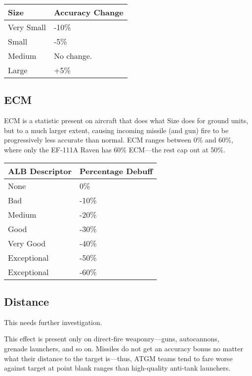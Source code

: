 \documentclass{article}
\begin{document}
\begin{center}
    \begin{tabular}{ | l | p{3cm} | }
    \hline
    Size & Accuracy Change \\ \hline
    Very Small & -10\% \\
    Small & -5\% \\ 
    Medium & No change. \\ 
    Large & +5\% \\ \hline
    \end{tabular}
\end{center}

\subsection{ECM}

ECM is a statistic present on aircraft that does what Size does for ground
units, but to a much larger extent, causing incoming missile (and gun) fire to
be progressively less accurate than normal. ECM ranges between 0\% and 60\%,
where only the EF-111A Raven has 60\% ECM---the rest cap out at 50\%.

\begin{center}
    \begin{tabular}{ | l | p{3cm} | }
    \hline
    ALB Descriptor & Percentage Debuff \\ \hline
    None & 0\% \\
    Bad & -10\% \\ 
    Medium & -20\% \\ 
    Good & -30\% \\ 
    Very Good & -40\% \\
    Exceptional & -50\% \\
    Exceptional & -60\% \\
    \hline
    \end{tabular}
\end{center}

\subsection{Distance}

This needs further investigation.

This effect is present only on direct-fire weaponry---guns, autocannons,\\
grenade launchers, and so on. Missiles do not get an accuracy bonus no matter
what their distance to the target is---thus, ATGM teams tend to fare worse
against target at point blank ranges than high-quality anti-tank launchers.
\end{document}
